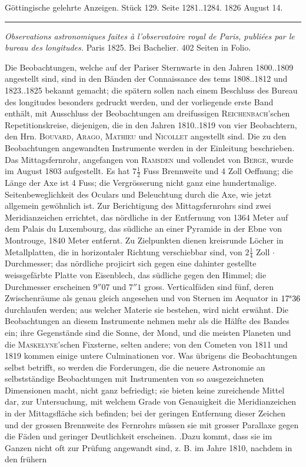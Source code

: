 \clearpage
{}
\hypertarget{native-646-lower}{}
\begin{center}\small Göttingische gelehrte Anzeigen. Stück 129. Seite 1281..1284. 1826 August 14.\\[3pt]\rule{.72\linewidth}{.3pt}\end{center}

\emph{Observations astronomiques faites à l'observatoire royal de Paris, publiées par le bureau des longitudes.} Paris 1825. Bei Bachelier. 402 Seiten in Folio.

Die Beobachtungen, welche auf der Pariser Sternwarte in den Jahren 1800..1809 angestellt sind, sind in den Bänden der Connaissance des tems 1808..1812 und 1823..1825 bekannt gemacht; die spätern sollen nach einem Beschluss des Bureau des longitudes besonders gedruckt werden, und der vorliegende erste Band enthält, mit Ausschluss der Beobachtungen am dreifussigen \textsc{Reichenbach}'schen Repetitionskreise, diejenigen, die in den Jahren 1810..1819 von vier Beobachtern, den Hrn. \textsc{Bouvard}, \textsc{Arago}, \textsc{Mathieu} und \textsc{Nicollet} angestellt sind. Die zu den Beobachtungen angewandten Instrumente werden in der Einleitung beschrieben. Das Mittagsfernrohr, angefangen von \textsc{Ramsden} und vollendet von \textsc{Berge}, wurde im August 1803 aufgestellt. Es hat $7\frac{1}{2}$ Fuss Brennweite und 4 Zoll Oeffnung; die Länge der Axe ist 4 Fuss; die Vergrösserung nicht ganz eine hundertmalige. Seitenbeweglichkeit des Oculars und Beleuchtung durch die Axe, wie jetzt allgemein gewöhnlich ist. Zur Berichtigung des Mittagsfernrohrs sind zwei Meridianzeichen errichtet, das nördliche in der Entfernung von 1364 Meter auf dem Palais du Luxembourg, das südliche an einer Pyramide in der Ebne von Montrouge, 1840 Meter entfernt. Zu Zielpunkten dienen kreisrunde Löcher in Metallplatten, die in horizontaler Richtung verschiebbar sind, von $2\frac{1}{4}$ Zoll $\cdot$ Durchmesser; das nördliche projicirt sich gegen eine dahinter gestellte weissgefärbte Platte von Eisenblech, das südliche gegen den Himmel; die Durchmesser erscheinen $9''07$ und $7''1$ gross. Verticalfäden sind fünf, deren Zwischenräume als genau gleich angesehen und von Sternen im Aequator in $17^{\rm s}36$ durchlaufen werden; aus welcher Materie sie bestehen, wird nicht erwähnt. Die Beobachtungen an diesem Instrumente nehmen mehr als die Hälfte des Bandes ein; ihre Gegenstände sind die Sonne, der Mond, und die meisten Planeten und die \textsc{Maskelyne}'schen Fixsterne, selten andere; von den Cometen von 1811 und 1819 kommen einige untere Culminationen vor. Was übrigens die Beobachtungen selbst betrifft, so werden die Forderungen, die die neuere Astronomie an selbstständige Beobachtungen mit Instrumenten von so ausgezeichneten Dimensionen macht, nicht ganz befriedigt; sie bieten keine zureichende Mittel dar, zur Untersuchung, mit welchem Grade von Genauigkeit die Meridianzeichen in der Mittagsfläche sich befinden; bei der geringen Entfernung dieser Zeichen und der grossen Brennweite des Fernrohrs müssen sie mit grosser Parallaxe gegen die Fäden und geringer Deutlichkeit erscheinen. .Dazu kommt, dass sie im Ganzen nicht oft zur Prüfung angewandt sind, z. B. im Jahre 1810, nachdem in den frühern 